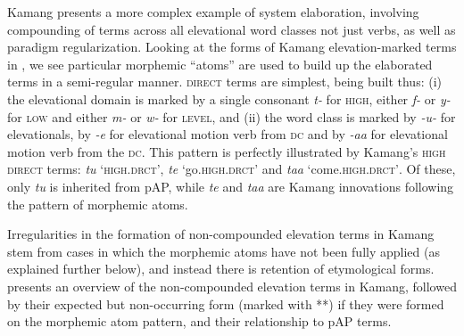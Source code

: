 Kamang presents a more complex example of system elaboration, involving compounding of terms across all elevational word classes not just verbs, as well as paradigm regularization. Looking at the forms of Kamang elevation-marked terms in , we see particular morphemic ``atoms'' are used to build up the elaborated terms in a semi-regular manner. \textsc{direct} terms are simplest, being built thus: (i) the elevational domain is marked by a single consonant \textit{t-} for \textsc{high}, either \textit{f-} or \textit{y-} for \textsc{low} and either \textit{m-}  or \textit{w-} for \textsc{level}, and (ii) the word class is marked by \textit{{}-u-{\ng}} for elevationals, by \textit{{}-e} for elevational motion verb from \textsc{dc} and by \textit{{}-aa{\ng}} for elevational motion verb from the \textsc{dc}. This pattern is perfectly illustrated by Kamang's \textsc{high} \textsc{direct} terms: \textit{tu{\ng}} `\textsc{high.drct'}, \textit{te} `go.\textsc{high.drct'} and \textit{taa{\ng}} `come.\textsc{high.drct'}. Of these, only \textit{tu{\ng}} is inherited from pAP, while \textit{te} and \textit{taa{\ng}} are Kamang innovations following the pattern of morphemic atoms. 

Irregularities in the formation of non-compounded elevation terms in Kamang stem from cases in which the morphemic atoms have not been fully applied (as explained further below), and instead there is retention of etymological forms.  presents an overview of the non-compounded elevation terms in Kamang, followed by their expected but non-occurring form (marked with **) if they were formed on the morphemic atom pattern, and their relationship to pAP terms.
 


